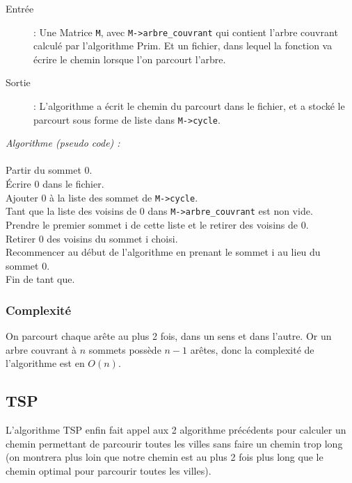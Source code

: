 \documentclass[a4paper,11pt]{article}
\begin{document}
\begin{description}
\item[Entrée] : Une \textsf{Matrice} \texttt{M}, avec \texttt{M->arbre\_couvrant} qui contient l'arbre couvrant calculé par l'algorithme Prim. Et un fichier, dans lequel la fonction va écrire le chemin lorsque l'on parcourt l'arbre.
\item[Sortie] : L'algorithme a écrit le chemin du parcourt dans le fichier, et a stocké le parcourt sous forme de liste dans \texttt{M->cycle}.\\
\end{description}
\textit{Algorithme (pseudo code) :}\\
\\
Partir du sommet 0.\\
Écrire 0 dans le fichier.\\
Ajouter 0 à la liste des sommet de \texttt{M->cycle}.\\
Tant que la liste des voisins de 0 dans \texttt{M->arbre\_couvrant} est non vide.\\
\hspace*{1cm}Prendre le premier sommet i de cette liste et le retirer des voisins de 0.\\
\hspace*{1cm}Retirer 0 des voisins du sommet i choisi.\\
\hspace*{1cm}Recommencer au début de l'algorithme en prenant le sommet i au lieu du sommet 0.\\
Fin de tant que.\\

\subsubsection*{Complexité}
On parcourt chaque arête au plus 2 fois, dans un sens et dans l'autre. Or un arbre couvrant à $n$ sommets possède $n-1$ arêtes, donc la complexité de l'algorithme est en $O(n)$.

\subsection{TSP}

L'algorithme TSP enfin fait appel aux 2 algorithme précédents pour calculer un chemin permettant de parcourir toutes les villes sans faire un chemin trop long (on montrera plus loin que notre chemin est au plus 2 fois plus long que le chemin optimal pour parcourir toutes les villes).
\end{document}
